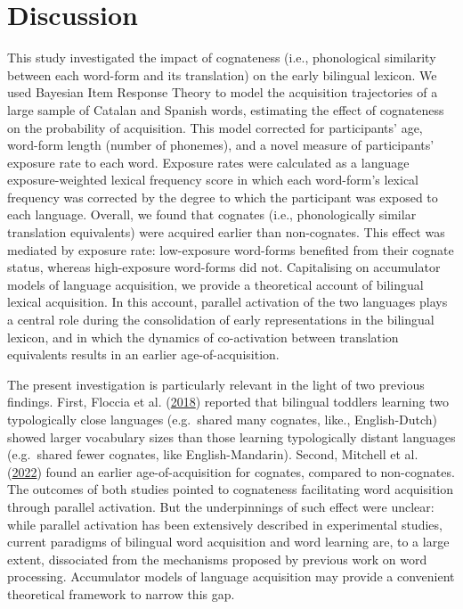 \documentclass[
]{article}
\begin{document}
\hypertarget{sec-discussion}{%
\section{Discussion}\label{sec-discussion}}

This study investigated the impact of cognateness (i.e., phonological
similarity between each word-form and its translation) on the early
bilingual lexicon. We used Bayesian Item Response Theory to model the
acquisition trajectories of a large sample of Catalan and Spanish words,
estimating the effect of cognateness on the probability of acquisition.
This model corrected for participants' age, word-form length (number of
phonemes), and a novel measure of participants' exposure rate to each
word. Exposure rates were calculated as a language exposure-weighted
lexical frequency score in which each word-form's lexical frequency was
corrected by the degree to which the participant was exposed to each
language. Overall, we found that cognates (i.e., phonologically similar
translation equivalents) were acquired earlier than non-cognates. This
effect was mediated by exposure rate: low-exposure word-forms benefited
from their cognate status, whereas high-exposure word-forms did not.
Capitalising on accumulator models of language acquisition, we provide a
theoretical account of bilingual lexical acquisition. In this account,
parallel activation of the two languages plays a central role during the
consolidation of early representations in the bilingual lexicon, and in
which the dynamics of co-activation between translation equivalents
results in an earlier age-of-acquisition.

The present investigation is particularly relevant in the light of two
previous findings. First, Floccia et al.
(\protect\hyperlink{ref-floccia2018introduction}{2018}) reported that
bilingual toddlers learning two typologically close languages
(e.g.~shared many cognates, like., English-Dutch) showed larger
vocabulary sizes than those learning typologically distant languages
(e.g.~shared fewer cognates, like English-Mandarin). Second, Mitchell et
al. (\protect\hyperlink{ref-mitchell2022cognates}{2022}) found an
earlier age-of-acquisition for cognates, compared to non-cognates. The
outcomes of both studies pointed to cognateness facilitating word
acquisition through parallel activation. But the underpinnings of such
effect were unclear: while parallel activation has been extensively
described in experimental studies, current paradigms of bilingual word
acquisition and word learning are, to a large extent, dissociated from
the mechanisms proposed by previous work on word processing. Accumulator
models of language acquisition may provide a convenient theoretical
framework to narrow this gap.
\end{document}
